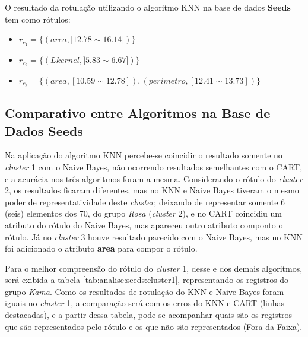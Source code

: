 O resultado da rotulação utilizando o algoritmo KNN na base de dados \textbf{Seeds} tem como rótulos: 
\begin{itemize}[noitemsep]
 \item ${r_{c_1}=\{ (area, ]12.78 \sim 16.14]) \} }$
 \item ${r_{c_2}=\{ (Lkernel, ]5.83 \sim 6.67]) \} }$
 \item ${r_{c_3}=\{ (area, [10.59 \sim 12.78]), (perimetro, [12.41 \sim 13.73]) \} }$
 
\end{itemize}


\subsection{Comparativo entre Algoritmos na Base de Dados Seeds} \label{cap:resultados:ssec:compalgoritmos:seeds}

Na aplicação do algoritmo KNN percebe-se coincidir o resultado somente no \textit{cluster} 1 com o Naive Bayes, não ocorrendo resultados semelhantes com o CART, e a acurácia nos três algoritmos foram a mesma. Considerando o rótulo do \textit{cluster} 2, os resultados ficaram diferentes, mas no KNN e Naive Bayes tiveram o mesmo poder de representatividade  deste \textit{cluster}, deixando de representar somente 6 (seis) elementos dos 70, do grupo \textit{Rosa} (\textit{cluster} 2), e no CART coincidiu um atributo do rótulo do Naive Bayes, mas apareceu outro atributo componto o rótulo. Já no \textit{cluster} 3 houve resultado parecido com o Naive Bayes, mas no KNN foi adicionado o  atributo \textbf{area} para compor o rótulo.


Para o melhor compreensão do rótulo do \textit{cluster} 1, desse e dos demais  algoritmos, será exibida a tabela \ref{tab:analise:seeds:cluster1}, representando os registros do grupo \textit{Kama}. Como os resultados de rotulação do KNN e Naive Bayes foram iguais no \textit{cluster} 1, a comparação será com os erros do KNN e CART (linhas destacadas), e a partir dessa tabela, pode-se acompanhar quais são os registros que são representados pelo rótulo e os que não são representados (Fora da Faixa). 


